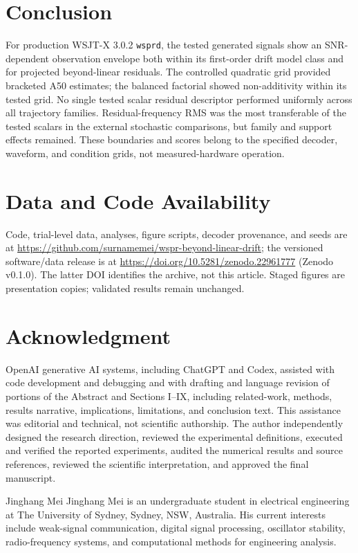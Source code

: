 \documentclass{ieeeaccess}
\begin{document}
\section{Conclusion}
For production WSJT-X 3.0.2 \texttt{wsprd}, the tested generated signals show an SNR-dependent observation envelope both within its first-order drift model class and for projected beyond-linear residuals. The controlled quadratic grid provided bracketed A50 estimates; the balanced factorial showed non-additivity within its tested grid. No single tested scalar residual descriptor performed uniformly across all trajectory families. Residual-frequency RMS was the most transferable of the tested scalars in the external stochastic comparisons, but family and support effects remained. These boundaries and scores belong to the specified decoder, waveform, and condition grids, not measured-hardware operation.

\section*{Data and Code Availability}
Code, trial-level data, analyses, figure scripts, decoder provenance, and seeds are at \url{https://github.com/surnamemei/wspr-beyond-linear-drift}; the versioned software/data release is at \url{https://doi.org/10.5281/zenodo.22961777} (Zenodo v0.1.0). The latter DOI identifies the archive, not this article. Staged figures are presentation copies; validated results remain unchanged.

\section*{Acknowledgment}
OpenAI generative AI systems, including ChatGPT and Codex, assisted with code development and debugging and with drafting and language revision of portions of the Abstract and Sections I--IX, including related-work, methods, results narrative, implications, limitations, and conclusion text. This assistance was editorial and technical, not scientific authorship. The author independently designed the research direction, reviewed the experimental definitions, executed and verified the reported experiments, audited the numerical results and source references, reviewed the scientific interpretation, and approved the final manuscript.



\begin{IEEEbiographynophoto}{Jinghang Mei}
Jinghang Mei is an undergraduate student in electrical engineering at The University of Sydney, Sydney, NSW, Australia. His current interests include weak-signal communication, digital signal processing, oscillator stability, radio-frequency systems, and computational methods for engineering analysis.
\end{IEEEbiographynophoto}
\EOD
\end{document}
